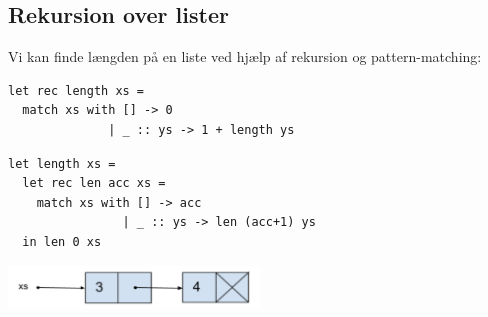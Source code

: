 \documentclass[rgb]{beamer}
\begin{document}
\subsection{Rekursion over lister}

\begin{frame}[fragile]
\begin{footnotesize}


  \vspace{1ex}
  Vi kan finde længden på en liste ved hjælp af rekursion og pattern-matching:

\begin{lstlisting}[numbers=none,frame=none,mathescape]
let rec length xs =
  match xs with [] -> 0
              | _ :: ys -> 1 + length ys
\end{lstlisting}

  \vspace{1ex}
\begin{lstlisting}[numbers=none,frame=none,mathescape]
let length xs =
  let rec len acc xs =
    match xs with [] -> acc
                | _ :: ys -> len (acc+1) ys
  in len 0 xs
\end{lstlisting}


\includegraphics[width=0.5\textwidth]{../images/list34.png}

\end{footnotesize}
\end{frame}
\end{document}
